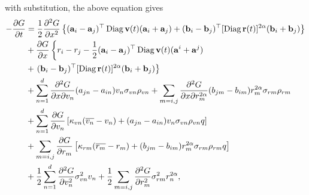 \documentclass[12pt]{report}
\begin{document}
with substitution, the above equation gives
\begin{align}
-\frac{\partial G}{\partial t}&= \frac{1}{2} \frac{\partial^{2} G}{\partial x^{2}}\left\{(\mathbf{a}_{i}-\mathbf{a}_{j})^{\top} \operatorname{Diag}\mathbf{v}(t)(\mathbf{a}_{i}+\mathbf{a}_{j}) + (\mathbf{b}_{i}-\mathbf{b}_{j})^{\top} [{\operatorname{Diag}\mathbf{r}(t)}]^{2\alpha}(\mathbf{b}_{i}+\mathbf{b}_{j})\right\} \notag\\
&+\frac{\partial G}{\partial x} \left\{r_{i}-r_{j}-\frac{1}{2}(\mathbf{a}_{i}-\mathbf{a}_{j})^{\top} \operatorname{Diag}\mathbf{v}(t)(\mathbf{a}^{i}+\mathbf{a}^{j}) \right. \notag\\
&+ \left.(\mathbf{b}_{i}-\mathbf{b}_{j})^{\top} [{\operatorname{Diag}\mathbf{r}(t)}]^{2\alpha}(\mathbf{b}_{i}+\mathbf{b}_{j})\right\}  \notag\\
&+\sum_{n=1}^{d} \frac{\partial^{2} G}{\partial x \partial v_{n}}(a_{jn}-a_{in}) v_{n} \sigma_{vn} \rho_{vn} + \sum_{m= i,j} \frac{\partial^{2} G}{\partial x \partial r_{m}^{2\alpha}}(b_{jm}-b_{im}) r_{m}^{2\alpha} \sigma_{rm} \rho_{rm}\notag \\
&+\sum_{n=1}^{d} \frac{\partial G}{\partial v_{n}} \left[\kappa_{vn}(\overline{v_{n}}-v_{n}) +(a_{jn}-a_{in}) v_{n} \sigma_{vn} \rho_{vn} q \right] \notag \\
&+ \sum_{m= i,j} \frac{\partial G}{\partial r_{m}} \left[\kappa_{rm}(\overline{r_{m}}-r_{m})+(b_{jm}-b_{im}) r_{m}^{2\alpha} \sigma_{rm} \rho_{rm}q\right]\notag\\
&+\frac{1}{2} \sum_{n=1}^{d} \frac{\partial^{2} G}{\partial v_{n}^{2}} \sigma_{vn}^{2} v_{n} +\frac{1}{2} \sum_{m= i,j} \frac{\partial^{2} G}{\partial r_{m}^{2}} \sigma_{rm}^{2} r_{n}^{2\alpha}, 
\end{align}

\printbibliography[title = {References}]
\end{document}
